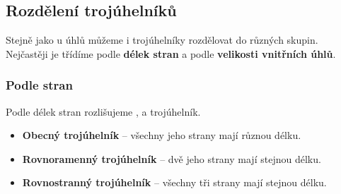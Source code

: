 \documentclass[12pt,a4paper]{article}
\begin{document}
\begin{center}
\end{center}

\subsection{Rozdělení trojúhelníků}

Stejně jako u úhlů můžeme i trojúhelníky rozdělovat do různých skupin.
Nejčastěji je třídíme podle \textbf{délek stran} a podle \textbf{velikosti vnitřních úhlů}.

\subsubsection*{Podle stran}

Podle délek stran rozlišujeme , 
a  trojúhelník.

\begin{itemize}
\item \textbf{Obecný trojúhelník} – všechny jeho strany mají různou délku.
\item \textbf{Rovnoramenný trojúhelník} – dvě jeho strany mají stejnou délku.
\item \textbf{Rovnostranný trojúhelník} – všechny tři strany mají stejnou délku.
\end{itemize}
\end{document}
